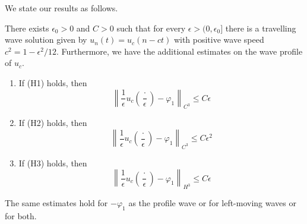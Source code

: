 We state our results as follows.
\begin{theorem}
	There exists \(\epsilon_0> 0\) and \(C> 0\) such that for every \(\epsilon > (0,\epsilon_0]\) there is a travelling wave solution given by \(u_n(t) = u_c(n-ct)\) with positive wave speed \(c^2 = 1 - \epsilon^2/12\). Furthermore, we have the additional estimates on the wave profile of \(u_c\).
	\begin{enumerate}[label = (\roman*)]
		\item If (H1) holds, then
		\begin{equation}
			\left\| \frac 1 \epsilon u_c\left(\frac \cdot \epsilon \right) - \varphi_1 \right\|_{C^3} \leq C \epsilon
		\end{equation}
		\item If (H2) holds, then
		\begin{equation}
			\left\| \frac 1 \epsilon u_c\left(\frac \cdot \epsilon \right) - \varphi_1 \right\|_{C^3} \leq C \epsilon^2
		\end{equation}
		\item If (H3) holds, then
		\begin{equation}
			\left\| \frac 1 \epsilon u_c\left(\frac \cdot \epsilon \right) - \varphi_1 \right\|_{H^3} \leq C \epsilon
		\end{equation}
	\end{enumerate}
\end{theorem}
The same estimates hold for \(-\varphi_1\) as the profile wave or for left-moving waves or for both.
